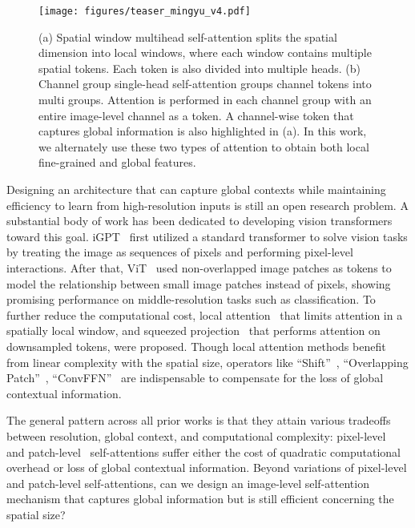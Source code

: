 \documentclass[runningheads]{llncs}
\begin{document}
\begin{figure}[t]
    \centering
    \texttt{[image: figures/teaser\_mingyu\_v4.pdf]}
    \vspace{-8pt}
    \caption{(a) Spatial window multihead self-attention splits the spatial dimension into local windows, where each window contains multiple spatial tokens. Each token is also divided into multiple heads.
    (b) Channel group single-head self-attention groups channel tokens into multi groups. Attention is performed in each channel group with an entire image-level channel as a token.
    A channel-wise token that captures global information is also highlighted in (a).
    In this work, we alternately use these two types of attention to obtain both local fine-grained and global features.
    }
    \label{fig:teaser}
    \vspace{-8pt}
\end{figure}


Designing an architecture that can capture global contexts while maintaining efficiency to learn from high-resolution inputs is still an open research problem. 
A substantial body of work has been dedicated to developing vision transformers toward this goal.
iGPT~\cite{chen2020generative} first utilized a standard transformer to solve vision tasks by treating the image as sequences of pixels and performing pixel-level interactions.
After that, ViT~\cite{dosovitskiy2020image} used non-overlapped image patches as tokens to model the relationship between small image patches instead of pixels, showing promising performance on middle-resolution tasks such as classification.
To further reduce the computational cost, local attention~\cite{liu2021swin,zhang2021multi,vaswani2021scaling} that limits attention in a spatially local window, and squeezed projection~\cite{wu2021cvt,wang2021pvtv2} that performs attention on downsampled tokens, were proposed.
Though local attention methods benefit from linear complexity with the spatial size, operators like ``Shift''~\cite{liu2021swin}, ``Overlapping Patch''~\cite{wu2021cvt,wang2021pvtv2}, ``ConvFFN''~\cite{wang2021pvtv2,yuan2021hrformer,xie2021segformer} are indispensable to compensate for the loss of global contextual information.


The general pattern across all prior works is that they attain various tradeoffs between resolution, global context, and computational complexity: pixel-level~\cite{chen2020generative} and patch-level~\cite{dosovitskiy2020image,liu2021swin,wu2021cvt,wang2021pyramid} self-attentions suffer either the cost of quadratic computational overhead or loss of global contextual information.
Beyond variations of pixel-level and patch-level self-attentions, can we design an image-level self-attention mechanism that captures global information but is still efficient concerning the spatial size?
\end{document}
